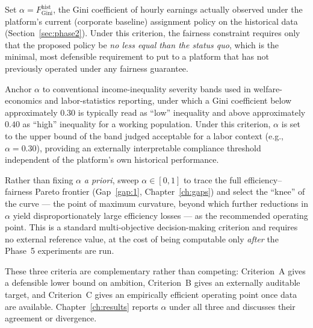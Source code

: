 \documentclass[12pt,a4paper]{report}
\begin{document}
\begin{description}[leftmargin=3.7cm,style=nextline]
    \item[Criterion A --- Historical-baseline anchor.] Set $\alpha = F_{\text{Gini}}^{\text{hist}}$, the Gini coefficient of hourly earnings actually observed under the platform's current (corporate baseline) assignment policy on the historical data (Section~\ref{sec:phase2}). Under this criterion, the fairness constraint requires only that the proposed policy be \emph{no less equal than the status quo}, which is the minimal, most defensible requirement to put to a platform that has not previously operated under any fairness guarantee.

    \item[Criterion B --- Inequality-severity bands.] Anchor $\alpha$ to conventional income-inequality severity bands used in welfare-economics and labor-statistics reporting, under which a Gini coefficient below approximately $0.30$ is typically read as ``low'' inequality and above approximately $0.40$ as ``high'' inequality for a working population. Under this criterion, $\alpha$ is set to the upper bound of the band judged acceptable for a labor context (e.g., $\alpha = 0.30$), providing an externally interpretable compliance threshold independent of the platform's own historical performance.

    \item[Criterion C --- Pareto-knee selection.] Rather than fixing $\alpha$ \emph{a priori}, sweep $\alpha \in [0,1]$ to trace the full efficiency--fairness Pareto frontier (Gap~\ref{gap:1}, Chapter~\ref{ch:gaps}) and select the ``knee'' of the curve --- the point of maximum curvature, beyond which further reductions in $\alpha$ yield disproportionately large efficiency losses --- as the recommended operating point. This is a standard multi-objective decision-making criterion and requires no external reference value, at the cost of being computable only \emph{after} the Phase~5 experiments are run.
\end{description}

\noindent These three criteria are complementary rather than competing: Criterion~A gives a defensible lower bound on ambition, Criterion~B gives an externally auditable target, and Criterion~C gives an empirically efficient operating point once data are available. Chapter~\ref{ch:results} reports $\alpha$ under all three and discusses their agreement or divergence.

\end{document}

